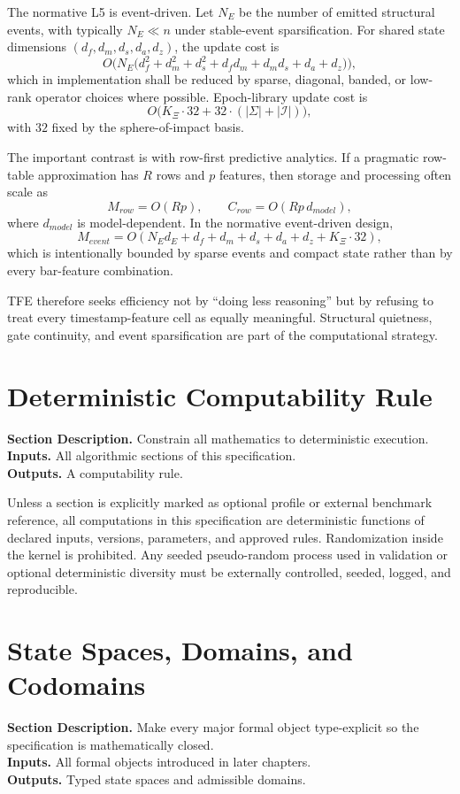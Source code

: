 \documentclass[11pt]{report}
\newcommand{\meta}[3]{\textbf{Section Description.} #1\\
\textbf{Inputs.} #2\\
\textbf{Outputs.} #3\par}
\begin{document}
The normative L5 is event-driven. Let $N_E$ be the number of emitted structural events, with typically $N_E\ll n$ under stable-event sparsification. For shared state dimensions $(d_f,d_m,d_s,d_a,d_z)$, the update cost is
\[
O\Big(N_E\big(d_f^2+d_m^2+d_s^2+d_f d_m+d_m d_s+d_a+d_z\big)\Big),
\]
which in implementation shall be reduced by sparse, diagonal, banded, or low-rank operator choices where possible. Epoch-library update cost is
\[
O\big(K_{\Xi}\cdot 32 + 32\cdot(|\Sigma|+|\mathcal{I}|)\big),
\]
with $32$ fixed by the sphere-of-impact basis.

The important contrast is with row-first predictive analytics. If a pragmatic row-table approximation has $R$ rows and $p$ features, then storage and processing often scale as
\[
M_{row}=O(Rp),\qquad C_{row}=O(Rp\,d_{model}),
\]
where $d_{model}$ is model-dependent. In the normative event-driven design,
\[
M_{event}=O(N_E d_E + d_f+d_m+d_s+d_a+d_z + K_{\Xi}\cdot 32),
\]
which is intentionally bounded by sparse events and compact state rather than by every bar-feature combination.

TFE therefore seeks efficiency not by ``doing less reasoning'' but by refusing to treat every timestamp-feature cell as equally meaningful. Structural quietness, gate continuity, and event sparsification are part of the computational strategy.

\section{Deterministic Computability Rule}
\meta{Constrain all mathematics to deterministic execution.}{All algorithmic sections of this specification.}{A computability rule.}

Unless a section is explicitly marked as optional profile or external benchmark reference, all computations in this specification are deterministic functions of declared inputs, versions, parameters, and approved rules. Randomization inside the kernel is prohibited. Any seeded pseudo-random process used in validation or optional deterministic diversity must be externally controlled, seeded, logged, and reproducible.


\section{State Spaces, Domains, and Codomains}
\meta{Make every major formal object type-explicit so the specification is mathematically closed.}{All formal objects introduced in later chapters.}{Typed state spaces and admissible domains.}
\end{document}
